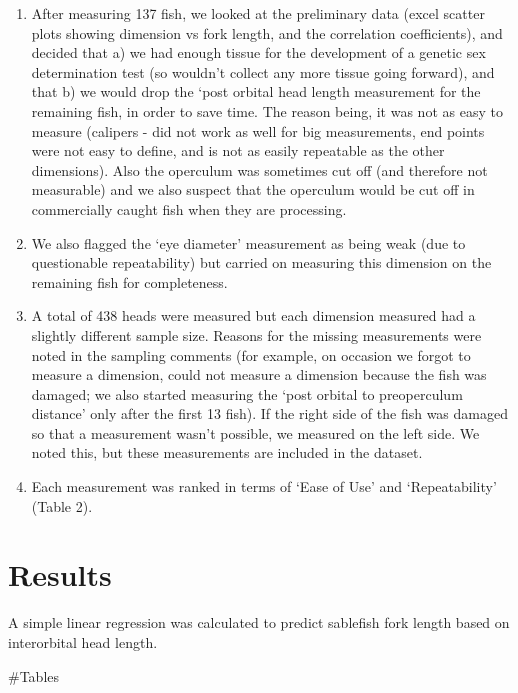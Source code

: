 \documentclass[12pt]{article}\usepackage[]{graphicx}\usepackage[]{color}
\begin{document}
\begin{enumerate}
\def\labelenumi{\arabic{enumi}.}
\setcounter{enumi}{4}
\item
  After measuring 137 fish, we looked at the preliminary data (excel scatter plots showing dimension vs fork length, and the correlation coefficients), and decided that a) we had enough tissue for the development of a genetic sex determination test (so wouldn't collect any more tissue going forward), and that b) we would drop the `post orbital head length measurement for the remaining fish, in order to save time. The reason being, it was not as easy to measure (calipers - did not work as well for big measurements, end points were not easy to define, and is not as easily repeatable as the other dimensions). Also the operculum was sometimes cut off (and therefore not measurable) and we also suspect that the operculum would be cut off in commercially caught fish when they are processing.
\item
  We also flagged the `eye diameter' measurement as being weak (due to questionable repeatability) but carried on measuring this dimension on the remaining fish for completeness.
\item
  A total of 438 heads were measured but each dimension measured had a slightly different sample size. Reasons for the missing measurements were noted in the sampling comments (for example, on occasion we forgot to measure a dimension, could not measure a dimension because the fish was damaged; we also started measuring the `post orbital to preoperculum distance' only after the first 13 fish). If the right side of the fish was damaged so that a measurement wasn't possible, we measured on the left side. We noted this, but these measurements are included in the dataset.
\item
  Each measurement was ranked in terms of `Ease of Use' and `Repeatability' (Table 2).
\end{enumerate}
\clearpage

\hypertarget{results}{%
\section{Results}\label{results}}

A simple linear regression was calculated to predict sablefish fork length based on interorbital head length.

\#Tables
\end{document}
